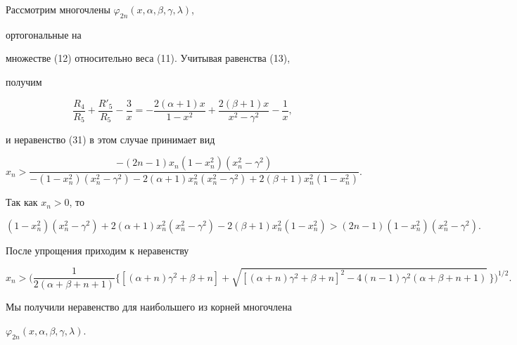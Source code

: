  


\begin{exam} 


Рассмотрим многочлены $\varphi_{2n}(x,\alpha,\beta,\gamma,\lambda)$, 


ортогональные на 


множестве (12) относительно веса (11). Учитывая равенства (13), 


получим 


$$ 


\frac{R_4}{R_5}+\frac{R'_5}{R_5}-\frac{3}{x}= 


-\frac{2(\alpha+1)x}{1-x^2}+\frac{2(\beta+1)x}{x^2-\gamma^2}- 


\frac{1}{x}, 


$$ 


и неравенство (31) в этом случае принимает вид 


$$ 


x_n>\frac{-(2n-1)x_n(1-x^2_n)(x^2_n-\gamma^2)} 


{-(1-x^2_n)(x^2_n-\gamma^2)-2(\alpha+1)x^2_n(x^2_n-\gamma^2) 


+2(\beta+1)x^2_n(1-x^2_n)}. 


$$ 


 


Так как $x_n>0$, то 


$$ 


(1-x^2_n)(x^2_n-\gamma^2)+2(\alpha+1)x^2_n(x^2_n-\gamma^2)- 


2(\beta+1)x^2_n(1-x^2_n)>(2n-1)(1-x^2_n)(x^2_n-\gamma^2). 


$$ 


После упрощения приходим к неравенству 


$$ 


x_n>\bigg(\frac{1}{2(\alpha+\beta+n+1)}\{[(\alpha+n)\gamma^2+ 


\beta+n]+\sqrt{[(\alpha+n)\gamma^2+\beta+n]^2- 


4(n-1)\gamma^2(\alpha+\beta+n+1)}\,\}\bigg)^{1/2}. 


$$ 


 


Мы получили неравенство для наибольшего из корней многочлена 


$\varphi_{2n}(x,\alpha,\beta,\gamma,\lambda)$. 


\end{exam} 


 


